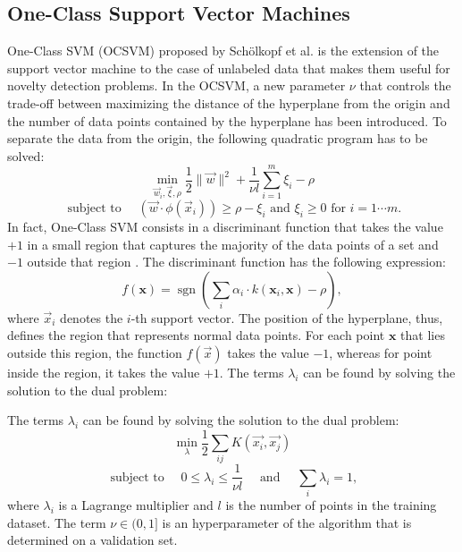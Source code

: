 \subsection{One-Class Support Vector Machines}
One-Class SVM (OCSVM) proposed by Sch{\"o}lkopf et al. \cite{scholkopf2000support} is the extension of the support vector machine to the case of unlabeled data that makes them useful for novelty detection problems. In the OCSVM, a new parameter $\nu$ 
that controls the trade-off between maximizing the distance of the hyperplane from the origin and the number of data points contained by the hyperplane has been introduced. To separate the data from the origin, the following quadratic program has to be solved:
\begin{equation}
\label{eq:ocsv_quadratic_problem}
\min_{\vec{w}_i, \vec{\xi}, \rho} \frac{1}{2} \|\vec{w}\|^2 +  \frac{1}{\nu l}\sum_{i = 1}^{m}\xi_i - \rho
\end{equation}
\begin{equation}\nonumber
\textrm{ subject to }\quad ( \vec{w}\cdot \phi(\vec{x}_i))  \geq \rho - \xi_i \textrm{ and } \xi_i \geq 0 \textrm{ for } i = 1 \cdots m.
\end{equation}
In fact, One-Class SVM consists in a discriminant function that takes the value $+1$ in a small region that captures the majority of the data points of a set and $-1$ outside that region \cite{scholkopf2000}. The discriminant function has the following expression:
\begin{equation}\label{eq:svm}
f(\mathbf{x}) = \mathop{\mathrm{sgn}} \left( \sum_{i} \alpha_i \cdot k(\mathbf{x}_i,\mathbf{x}) - \rho\right),
\end{equation}
where $ \vec{x}_i$ denotes the $i$-th support vector. The position of the hyperplane, thus, defines the region that represents normal data points. For each point $\textbf{x}$ that lies outside this region, the function $f( \vec{x})$ takes the value $-1$, whereas for point inside the region, it takes the value $+1$.
The terms $\lambda_i$ can be found by solving the solution to the dual problem:


The terms $\lambda_i$ can be found by solving the solution to the dual problem:
\begin{equation}
\min_{\lambda} \frac{1}{2} \sum_{ij}^{} K(\vec{x_i}, \vec{x_j}) 
\end{equation}
\begin{equation}\nonumber
\textrm{ subject to }\quad 0 \leq \lambda_i \leq \frac{1}{\nu l}\quad \textrm{ and }\quad \sum_{i}^{} \lambda_i = 1,
\end{equation}
where $\lambda_i$ is a Lagrange  multiplier and $l$ is the number of points in the  training dataset.
The term $\nu \in (0,1]$ is an hyperparameter of the algorithm that is determined on a validation set. 

